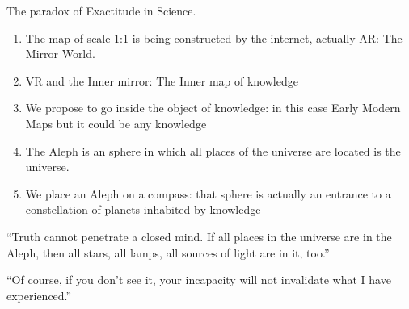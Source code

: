 \documentclass{beamer}
\begin{document}
\begin{frame}{The paradox of Exactitude in Science.}
	\begin{enumerate}
		\item The map of scale 1:1 is being constructed by the internet, 
			actually AR: The Mirror World.
		\item VR and the Inner mirror: The Inner map of knowledge
		\item We propose to go inside the object of knowledge: in this case Early Modern Maps but it could be any knowledge
		\item The Aleph is an sphere in which all places of the universe are located is the universe.
		\item We place an Aleph on a compass:  that sphere is actually an entrance to a constellation of planets inhabited by knowledge
	\end{enumerate}
\end{frame}
\begin{frame}
	``Truth cannot penetrate a closed mind. If all places in the universe are in the Aleph, then all stars, all lamps, all sources of light are in it, too.''\par

	``Of course, if you don’t see it, your incapacity will not invalidate what I have experienced.''
\end{frame}
\end{document}
